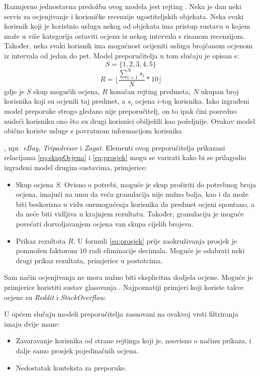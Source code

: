 \documentclass[times, utf8, diplomski, numeric]{fer}
\begin{document}
Razmjerno jednostavna predožba ovog modela jest rejting . Neka je
dan neki servis za ocjenjivanje i korisničke recenzije ugostiteljskih objekata.
Neka svaki korisnik koji je koristnio uslugu nekog od objekata ima pristup
sustavu u kojem može u više kategorija ostaviti ocjenu iz nekog intervala s
 risanom recenzijom. Također, neka svaki korisnik ima mogućnost ocijeniti uslugu
brojčanom ocjenom iz intervala od jedan do pet. Model preporučitelja u tom
slučaju je opisan s:
\begin{equation}
\label{eq:skupOcjena}
	S = \{1, 2, 3, 4, 5\}
\end{equation}
\begin{equation}
\label{eq:prosjek}
	R = \lfloor \frac{\sum_{i=1}^{N} s_i}{N} \ast 10 \rfloor
\end{equation}
gdje je $S$ skup mogućih ocjena, $R$ konačan rejting predmeta, $N$ ukupan broj
korisnika koji su ocjenili taj predmet, a $s_i$ ocjena $i$-tog korisnika. Iako
izgrađeni model preporuke strogo gledano nije preporučitelj, on to ipak čini
posredno nudeći korisniku ono što su drugi korisnici obilježili kao poželjnije.
Ovakav model obično koriste usluge s povratnom informacijom korisnika

, npr. \emph{eBay}, \emph{Tripadvisor} i \emph{Zagat}.
Elementi ovog preporučitelja prikazani relacijama \ref{eq:skupOcjena} i
\ref{eq:prosjek} mogu se varirati kako bi se prilagodio izgrađeni model drugim
sustavima, primjerice:
\begin{itemize}
  \item Skup ocjena $S$. Ovisno o potrebi, moguće je skup proširiti do potrebnog
  broja ocjena, imajući na umu da veća granulacija nije nužno bolja, kao i da
  može biti beskorisna u vidu onemogućenja korisnika da predmet ocjeni spontano,
  a da neće biti vidljiva u krajnjem rezultatu. Također, granulaciju je moguće
  povećati dozvoljavanjem ocjena van skupa cijelih brojeva.
  \item Prikaz rezultata $R$. U formuli \ref{eq:prosjek} prije zaokruživanja
  prosjek je pomnožen faktorom $10$ radi eliminacije decimala. Moguće je
  odabrati neki drugi prikaz rezultata, primjerice u postotcima.
\end{itemize}
Sam način ocjenjivanja ne mora nužno biti eksplicitna dodjela ocjene. Moguće je
primjerice koristiti sustav glasovanja  .
Najpoznatiji primjeri koji koriste takve ocjene su \emph{Reddit} i \emph{StackOverflow}.

U općem slučaju modeli preporučitelja zasnovani na ovakvoj vrsti filtriranja
imaju dvije mane:
\begin{itemize}
  \item Zavaravanje korisnika od strane rejtinga koji je, neovisno o načinu
  prikaza, i dalje samo prosjek pojedinačnih ocjena.
  \item Nedostatak konteksta za preporuke.
\end{itemize}
\end{document}

